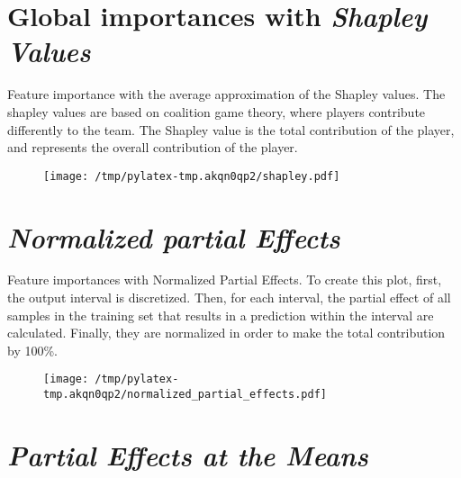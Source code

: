 \documentclass{article}%
\begin{document}
                \lfoot{}
                \cfoot{}
                \rfoot{\thepage\ | \pageref{LastPage}}
\section*{Global importances with \textit{Shapley Values}}%
\label{sec:GlobalimportanceswithtextitShapleyValues}%

                Feature importance with the average approximation of the 
                Shapley values. The shapley values are based on coalition game
                theory, where players contribute differently to the team. The
                Shapley value is the total contribution of the player, and
                represents the overall contribution of the player.
            
                \vfill%


\begin{figure}[H]%
\centering%
\texttt{[image: /tmp/pylatex-tmp.akqn0qp2/shapley.pdf]}%
\end{figure}

%
\vfill \pagebreak

%
\section*{\textit{Normalized partial Effects}}%
\label{sec:textitNormalizedpartialEffects}%

                Feature importances with Normalized Partial Effects. 
                To create this plot, first, the output interval is discretized.
                Then, for each interval, the partial effect of all samples
                in the training set that results in a prediction within the
                interval are calculated. Finally, they are normalized in
                order to make the total contribution by 100\%.

                \vfill%


\begin{figure}[H]%
\centering%
\texttt{[image: /tmp/pylatex-tmp.akqn0qp2/normalized\_partial\_effects.pdf]}%
\end{figure}

%
\vfill \pagebreak

%
\section*{\textit{Partial Effects at the Means}}%
\label{sec:textitPartialEffectsattheMeans}%
\end{document}
